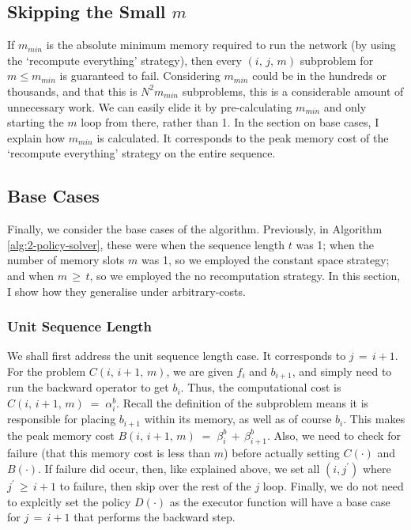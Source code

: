 \subsection{Skipping the Small \texorpdfstring{\(m\)}{\textit{m}}}
If \(m_{min}\) is the absolute minimum memory required to run the network (by using the `recompute everything' strategy), then every \((i,\,j,\,m)\) subproblem for \(m\leq m_{min}\) is guaranteed to fail.
Considering \(m_{min}\) could be in the hundreds or thousands, and that this is \(N^2 m_{min}\) subproblems, this is a considerable amount of unnecessary work.
We can easily elide it by pre-calculating \(m_{min}\) and only starting the \(m\) loop from there, rather than 1.
In the section on base cases, I explain how \(m_{min}\) is calculated.
It corresponds to the peak memory cost of the `recompute everything' strategy on the entire sequence.

\subsection{Base Cases}
Finally, we consider the base cases of the algorithm.
Previously, in Algorithm \ref{alg:2-policy-solver}, these were when the sequence length \(t\) was 1;
when the number of memory slots \(m\) was 1, so we employed the constant space strategy;
and when \(m \,\geq\, t\), so we employed the no recomputation strategy.
In this section, I show how they generalise under arbitrary-costs.

\subsubsection*{Unit Sequence Length}
We shall first address the unit sequence length case.
It corresponds to \(j \,=\, i+1\).
For the problem \(C(i,\,i+1,\,m)\), we are given \(f_i\) and \(b_{i+1}\), and simply need to run the backward operator to get \(b_i\).
Thus, the computational cost is \(C(i,\,i+1,\,m) \;=\; \alpha^b_i\).
Recall the definition of the subproblem means it is responsible for placing \(b_{i+1}\) within its memory, as well as of course \(b_{i}\).
This makes the peak memory cost \(B(i,\,i+1,\,m) \;=\; \beta^b_i \,+\, \beta^b_{i+1}\).
Also, we need to check for failure (that this memory cost is less than \(m\)) before actually setting \(C(\cdot)\) and \(B(\cdot)\).
If failure did occur, then, like explained above, we set all \((i, j^\prime)\) where \(j^\prime \,\geq\, i+1\) to failure, then skip over the rest of the \(j\) loop.
Finally, we do not need to explcitly set the policy \(D(\cdot)\) as the executor function will have a base case for \(j \,=\, i+1\) that performs the backward step.

